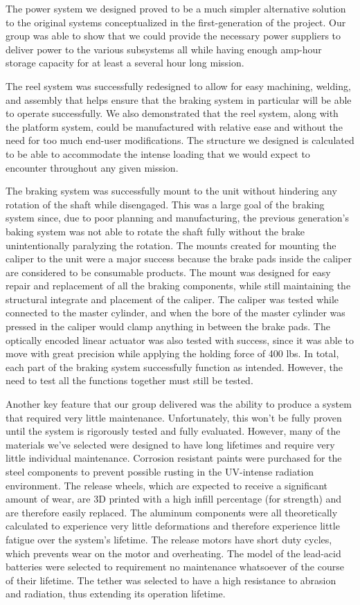 The power system we designed proved to be a much simpler alternative solution to the original systems conceptualized in the first-generation of the project. Our group was able to show that we could provide the necessary power suppliers to deliver power to the various subsystems all while having enough amp-hour storage capacity for at least a several hour long mission. 

The reel system was successfully redesigned to allow for easy machining, welding, and assembly that helps ensure that the braking system in particular will be able to operate successfully. We also demonstrated that the reel system, along with the platform system, could be manufactured with relative ease and without the need for too much end-user modifications. The structure we designed is calculated to be able to accommodate the intense loading that we would expect to encounter throughout any given mission. 

The braking system was successfully mount to the unit without hindering any rotation of the shaft while disengaged. This was a large goal of the braking system since, due to poor planning and manufacturing, the previous generation's baking system was not able to rotate the shaft fully without the brake unintentionally paralyzing the rotation. The mounts created for mounting the caliper to the unit were a major success because the brake pads inside the caliper are considered to be consumable products. The mount was designed for easy repair and replacement of all the braking components, while still maintaining the structural integrate and placement of the caliper. The caliper was tested while connected to the master cylinder, and when the bore of the master cylinder was pressed in the caliper would clamp anything in between the brake pads. The optically encoded linear actuator was also tested with success, since it was able to move with great precision while applying the holding force of 400 lbs. In total, each part of the braking system successfully function as intended. However, the need to test all the functions together must still be tested.

Another key feature that our group delivered was the ability to produce a system that required very little maintenance. Unfortunately, this won't be fully proven until the system is rigorously tested and fully evaluated. However, many of the materials we've selected were designed to have long lifetimes and require very little individual maintenance. Corrosion resistant paints were purchased for the steel components to prevent possible rusting in the UV-intense radiation environment. The release wheels, which are expected to receive a significant amount of wear, are 3D printed with a high infill percentage (for strength) and are therefore easily replaced. The aluminum components were all theoretically calculated to experience very little deformations and therefore experience little fatigue over the system's lifetime. The release motors have short duty cycles, which prevents wear on the motor and overheating. The model of the lead-acid batteries were selected to requirement no maintenance whatsoever of the course of their lifetime. The tether was selected to have a high resistance to abrasion and radiation, thus extending its operation lifetime. 


